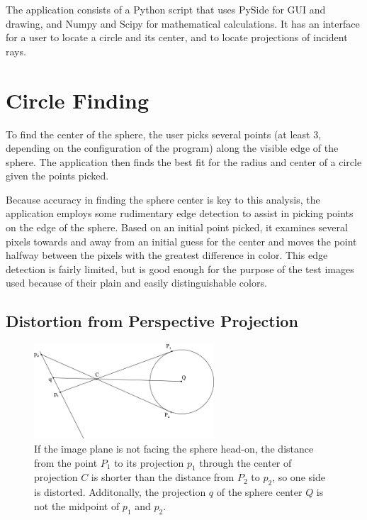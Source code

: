 \documentclass{thesis}
\begin{document}
The application consists of a Python script that uses PySide for GUI and drawing, and Numpy and Scipy for mathematical calculations. It has an interface for a user to locate a circle and its center, and to locate projections of incident rays.

\section{Circle Finding}
To find the center of the sphere, the user picks several points (at least 3, depending on the configuration of the program) along the visible edge of the sphere. The application then finds the best fit for the radius and center of a circle given the points picked.

Because accuracy in finding the sphere center is key to this analysis, the application employs some rudimentary edge detection to assist in picking points on the edge of the sphere. Based on an initial point picked, it examines several pixels towards and away from an initial guess for the center and moves the point halfway between the pixels with the greatest difference in color. This edge detection is fairly limited, but is good enough for the purpose of the test images used because of their plain and easily distinguishable colors.

\subsection{Distortion from Perspective Projection}
\label{sec:perspective-distortion}

\begin{figure}
	\centering
    	\includegraphics[width=0.6\textwidth]{sphere-distortion}
	\caption{If the image plane is not facing the sphere head-on, the distance from the point $P_1$ to its projection $p_1$ through the center of projection $C$ is shorter than the distance from $P_2$ to $p_2$, so one side is distorted. Additonally, the projection $q$ of the sphere center $Q$ is not the midpoint of $p_1$ and $p_2$.}
	\label{sphere-distortion}
\end{figure}
\end{document}
